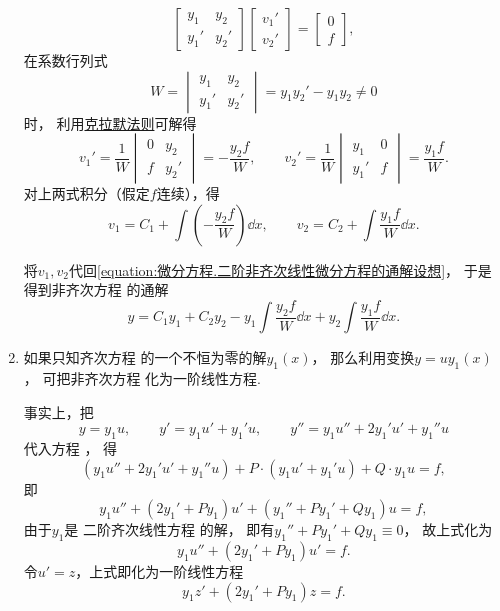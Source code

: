 \begin{enumerate}
\[\begin{bmatrix}
			y_1 & y_2 \\
			y_1' & y_2'
		\end{bmatrix}
		\begin{bmatrix}
			v_1' \\ v_2'
		\end{bmatrix}
		= \begin{bmatrix}
			0 \\ f
		\end{bmatrix},
	\]
	在系数行列式\[
		W = \begin{vmatrix} y_1 & y_2 \\ y_1' & y_2' \end{vmatrix}
		= y_1 y_2' - y_1 y_2 \neq0
	\]时，
	利用\hyperref[theorem:线性方程组.克拉默法则]{克拉默法则}可解得\[
		v_1'
		= \frac1W \begin{vmatrix}
			0 & y_2 \\
			f & y_2'
		\end{vmatrix}
		= -\frac{y_2 f}{W},
		\qquad
		v_2'
		= \frac1W \begin{vmatrix}
			y_1 & 0 \\
			y_1' & f
		\end{vmatrix}
		= \frac{y_1 f}{W}.
	\]
	对上两式积分（假定\(f\)连续），得\[
		v_1 = C_1 + \int \left(-\frac{y_2 f}{W}\right) \dd{x},
		\qquad
		v_2 = C_2 + \int \frac{y_1 f}{W} \dd{x}.
	\]

	将\(v_1,v_2\)代回\cref{equation:微分方程.二阶非齐次线性微分方程的通解设想}，
	于是得到非齐次方程  的通解
	\begin{equation}\label{equation:微分方程.二阶非齐次线性微分方程的通解.形式1}
		y = C_1 y_1 + C_2 y_2
		- y_1 \int \frac{y_2 f}{W} \dd{x}
		+ y_2 \int \frac{y_1 f}{W} \dd{x}.
	\end{equation}

	\item%
	如果只知齐次方程 
	的一个不恒为零的解\(y_1(x)\)，
	那么利用变换\(y = u y_1(x)\)，
	可把非齐次方程 
	化为一阶线性方程.

	事实上，把\[
		y = y_1 u, \qquad y' = y_1 u' + y_1' u, \qquad y'' = y_1 u'' + 2 y_1' u' + y_1'' u
	\]
	代入方程 ，
	得\[
		(y_1 u'' + 2y_1' u' + y_1'' u) + P\cdot(y_1 u' + y_1' u) + Q \cdot y_1 u = f,
	\]
	即\[
		y_1 u'' + (2y_1' + P y_1) u' + (y_1'' + P y_1' + Q y_1) u = f,
	\]
	由于\(y_1\)是
	二阶齐次线性方程  的解，
	即有\(y_1'' + P y_1' + Q y_1 \equiv 0\)，
	故上式化为\[
		y_1 u'' + (2 y_1' + P y_1) u' = f.
	\]
	令\(u' = z\)，上式即化为一阶线性方程
	\begin{equation}\label{equation:微分方程.降为一阶的二阶线性微分方程}
		y_1 z' + (2 y_1' + P y_1) z = f.
	\end{equation}


\end{enumerate}
